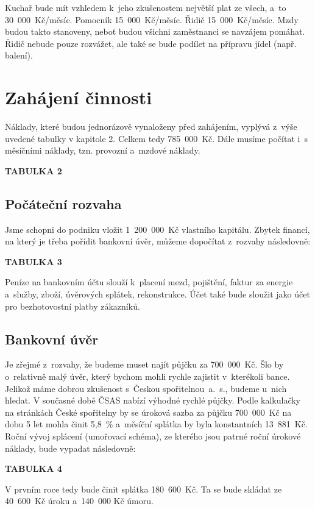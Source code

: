 Kuchař bude mít vzhledem k~jeho zkušenostem největší plat ze všech, a~to 30~000~Kč/měsíc. Pomocník 15~000~Kč/měsíc. Řidič 15~000~Kč/měsíc. Mzdy budou takto stanoveny, neboť budou všichni zaměstnanci se navzájem pomáhat. Řidič nebude pouze rozvážet, ale také se bude podílet na přípravu jídel (např. balení).





\section{Zahájení činnosti}
Náklady, které budou jednorázově vynaloženy před zahájením, vyplývá z~výše uvedené tabulky v kapitole 2. Celkem tedy 785~000~Kč. Dále musíme počítat i~s~ měsíčními náklady, tzn. provozní a~mzdové náklady.

\textbf{TABULKA 2}

\subsection{Počáteční rozvaha}
Jsme schopni do podniku vložit 1~200~000~Kč vlastního kapitálu. Zbytek financí, na který je třeba pořídit bankovní úvěr, můžeme dopočítat z~rozvahy následovně:

\textbf{TABULKA 3}

Peníze na bankovním účtu slouží k~placení mezd, pojištění, faktur za energie a~služby, zboží, úvěrových splátek, rekonstrukce. Účet také bude sloužit jako účet pro bezhotovostní platby zákazníků.

\subsection{Bankovní úvěr}
Je zřejmé z~rozvahy, že budeme muset najít půjčku za 700~000~Kč. Šlo by o~relativně malý úvěr, který bychom mohli rychle zajistit v~kterékoli bance. Jelikož máme dobrou zkušenost s~Českou spořitelnou~a.~s., budeme u~nich hledat. V současné době ČSAS nabízí výhodné rychlé půjčky. Podle kalkulačky na stránkách České spořitelny by se úroková sazba za půjčku 700~000~Kč na dobu 5 let mohla činit 5,8~\% a~měsíční splátka by byla konstantních 13~881~Kč. Roční vývoj splácení (umořovací schéma), ze kterého jsou patrné roční úrokové náklady, bude vypadat následovně:

\textbf{TABULKA 4}

V prvním roce tedy bude činit splátka 180~600~Kč. Ta se bude skládat ze 40~600~Kč úroku a~140~000 Kč úmoru.





